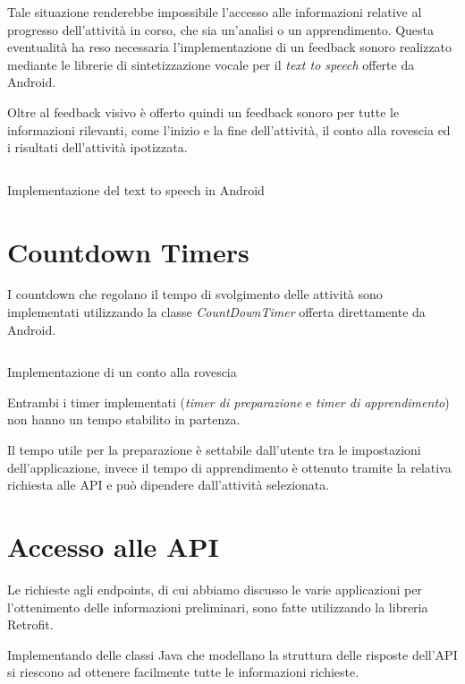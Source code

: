 Tale situazione renderebbe impossibile l'accesso alle informazioni relative al progresso dell'attività in corso, che sia 
un'analisi o un apprendimento.
Questa eventualità ha reso necessaria l'implementazione di un feedback sonoro realizzato mediante le librerie 
di sintetizzazione vocale per il \textit{text to speech} \cite{tts} offerte da Android.

Oltre al feedback visivo è offerto quindi un feedback sonoro per tutte le informazioni rilevanti, come l'inizio e la fine dell'attività, 
il conto alla rovescia ed i risultati dell'attività ipotizzata.

\vfill
\begin{listing}[H] 
    \inputminted[frame=single,framesep=10pt]{java}{assets/snippets/app/voice.java}
    \caption{Implementazione del text to speech in Android}
\end{listing}



\section{Countdown Timers}
I countdown che regolano il tempo di svolgimento delle attività sono implementati utilizzando la 
classe \textit{CountDownTimer} \cite{countdown} offerta direttamente da Android.
\begin{listing}[H] 
    \inputminted[frame=single,framesep=10pt]{java}{assets/snippets/app/countdown.java}
    \caption{Implementazione di un conto alla rovescia}
\end{listing}
\noindent Entrambi i timer implementati (\textit{timer di preparazione} e \textit{timer di apprendimento}) non hanno un tempo stabilito in partenza. 

Il tempo utile per la preparazione è settabile dall'utente tra le impostazioni dell'applicazione, invece il tempo di 
apprendimento è ottenuto tramite la relativa richiesta alle API e può dipendere dall'attività selezionata.



\section{Accesso alle API}
Le richieste agli endpoints, di cui abbiamo discusso le varie applicazioni per l'ottenimento delle informazioni preliminari, 
sono fatte utilizzando la libreria Retrofit. 

Implementando delle classi Java che modellano la struttura delle risposte dell'API si riescono ad ottenere facilmente 
tutte le informazioni richieste.

